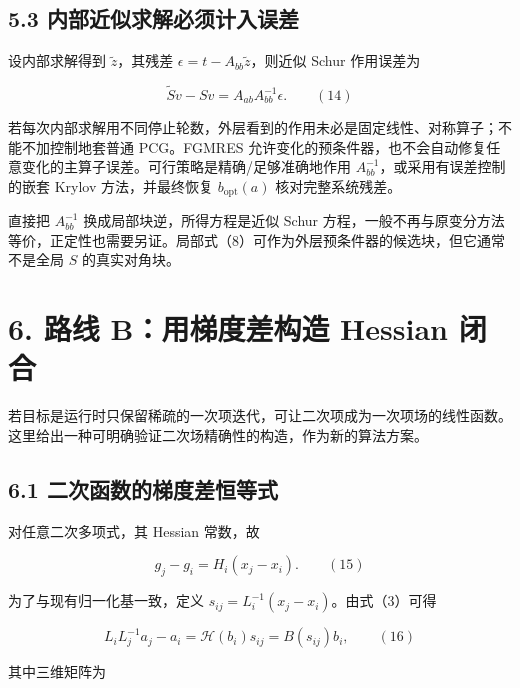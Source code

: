\documentclass[
  11pt,
  a4paper,
]{article}
\begin{document}
\hypertarget{ux5185ux90e8ux8fd1ux4f3cux6c42ux89e3ux5fc5ux987bux8ba1ux5165ux8befux5dee}{%
\subsection{5.3
内部近似求解必须计入误差}\label{ux5185ux90e8ux8fd1ux4f3cux6c42ux89e3ux5fc5ux987bux8ba1ux5165ux8befux5dee}}

设内部求解得到 \(\widetilde z\)，其残差
\(\epsilon=t-A_{bb}\widetilde z\)，则近似 Schur 作用误差为

\[
\widetilde S v-Sv=A_{ab}A_{bb}^{-1}\epsilon. \qquad(14)
\]

若每次内部求解用不同停止轮数，外层看到的作用未必是固定线性、对称算子；不能不加控制地套普通
PCG。FGMRES
允许变化的预条件器，也不会自动修复任意变化的主算子误差。可行策略是精确/足够准确地作用
\(A_{bb}^{-1}\)，或采用有误差控制的嵌套 Krylov 方法，并最终恢复
\(b_{\mathrm{opt}}(a)\) 核对完整系统残差。

直接把 \(A_{bb}^{-1}\) 换成局部块逆，所得方程是近似 Schur
方程，一般不再与原变分方法等价，正定性也需要另证。局部式（8）可作为外层预条件器的候选块，但它通常不是全局
\(S\) 的真实对角块。

\hypertarget{ux8defux7ebf-bux7528ux68afux5ea6ux5deeux6784ux9020-hessian-ux95edux5408}{%
\section{6. 路线 B：用梯度差构造 Hessian
闭合}\label{ux8defux7ebf-bux7528ux68afux5ea6ux5deeux6784ux9020-hessian-ux95edux5408}}

若目标是运行时只保留稀疏的一次项迭代，可让二次项成为一次项场的线性函数。这里给出一种可明确验证二次场精确性的构造，作为新的算法方案。

\hypertarget{ux4e8cux6b21ux51fdux6570ux7684ux68afux5ea6ux5deeux6052ux7b49ux5f0f}{%
\subsection{6.1
二次函数的梯度差恒等式}\label{ux4e8cux6b21ux51fdux6570ux7684ux68afux5ea6ux5deeux6052ux7b49ux5f0f}}

对任意二次多项式，其 Hessian 常数，故

\[
g_j-g_i=H_i(x_j-x_i). \qquad(15)
\]

为了与现有归一化基一致，定义 \(s_{ij}=L_i^{-1}(x_j-x_i)\)。由式（3）可得

\[
L_iL_j^{-1}a_j-a_i=\mathcal H(b_i)s_{ij}=B(s_{ij})b_i, \qquad(16)
\]

其中三维矩阵为
\end{document}
